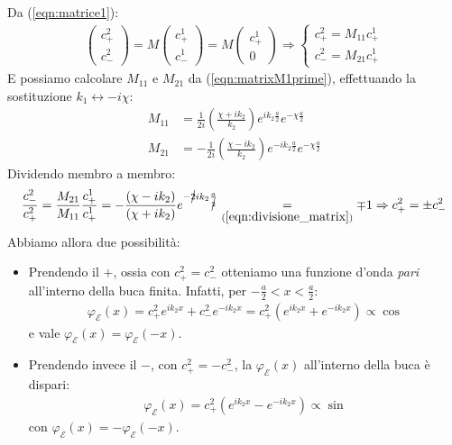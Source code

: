 \documentclass[../../FisicaTeorica.tex]{subfiles}
\begin{document}
Da (\ref{eqn:matrice1}):
\begin{align*}
\begin{pmatrix} c^2_+ \\ c^2_- \end{pmatrix} = M \begin{pmatrix} c^1_+ \\ c^1_- \end{pmatrix} = M \begin{pmatrix} c^1_+ \\ 0 \end{pmatrix}\Rightarrow \begin{cases}
c^2_+ = M_{11} c^1_+\\
c^2_- = M_{21} c^1_+
\end{cases}
\end{align*}
E possiamo calcolare $M_{11}$ e $M_{21}$ da (\ref{eqn:matrixM1prime}), effettuando la sostituzione $k_1 \leftrightarrow -i\chi$:
\begin{align*}
M_{11} &= \frac{1}{2i} \left(\frac{\chi + ik_2}{k_2}\right) e^{ik_2 \frac{a}{2}} e^{-\chi \frac{a}{2}}\\
M_{21} &= -\frac{1}{2i}\left(\frac{\chi - ik_2}{k_2}\right) e^{-ik_2 \frac{a}{2}}e^{-\chi \frac{a}{2}}
\end{align*}
Dividendo membro a membro:
\begin{align*}
\frac{c^2_-}{c^2_+} = \frac{M_{21}}{M_{11}}\frac{c^1_+}{c^1_+} = -\frac{(\chi-ik_2)}{(\chi+ik_2)} e^{-\cancel{2}ik_2 \frac{a}{\cancel{2}}} \underset{(\ref{eqn:divisione_matrix})}{=} \mp 1 \Rightarrow  c^2_+ = \pm c^2_-
\end{align*}
Abbiamo allora due possibilità:
\begin{itemize}
\item Prendendo il $+$, ossia con $c^2_+ = c^2_-$ otteniamo una funzione d'onda \textit{pari} all'interno della buca finita. Infatti, per $-\frac{a}{2}< x < \frac{a}{2}$:
\begin{align*}
\varphi_{\mathcal{E}}(x) = c^2_+ e^{ik_2 x} + c^2_- e^{-ik_2 x} = c^2_+ (e^{ik_2x}+ e^{-ik_2 x}) \propto \cos
\end{align*}
e vale $\varphi_\mathcal{E}(x) = \varphi_\mathcal{E}(-x)$.
\item Prendendo invece il $-$, con $c^2_+ = - c^2_-$, la $\varphi_\mathcal{E}(x)$ all'interno della buca è dispari:
\begin{align*}
\varphi_\mathcal{E}(x) = c^2_+ (e^{ik_2 x} - e^{-ik_2 x}) \propto \sin
\end{align*}
con $\varphi_\mathcal{E}(x) = - \varphi_\mathcal{E}(-x)$.
\end{itemize}
\end{document}
